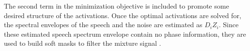 %
The second term in the minimization objective is included to promote some desired structure of the activations. 
Once the optimal activations are solved for, the spectral envelopes of the speech and the noise are 
estimated as $ {D}_{i} Z_{i}$. Since these estimated speech spectrum envelope contain no phase information, 
they are used to build soft masks to filter the mixture signal \cite{schmidt07mlsp}.


%
%
